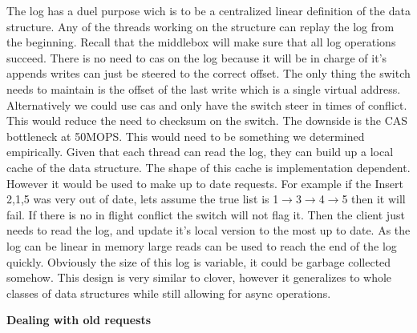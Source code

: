 The log has a duel purpose wich is to be a centralized linear definition of the
data structure. Any of the threads working on the structure can replay the log
from the beginning. Recall that the middlebox will make sure that all log
operations succeed. There is no need to cas on the log because it will be in
charge of it's appends writes can just be steered to the correct offset. The
only thing the switch needs to maintain is the offset of the last write which is
a single virtual address. Alternatively we could use cas and only have the switch
steer in times of conflict. This would reduce the need to checksum on the
switch. The downside is the CAS bottleneck at 50MOPS. This would need to be
something we determined empirically. Given that each thread can read the log,
they can build up a local cache of the data structure. The shape of this cache
is implementation dependent. However it would be used to make up to date
requests. For example if the Insert 2,1,5 was very out of date, lets assume the
true list is 1$\rightarrow$3$\rightarrow$4$\rightarrow$5 then it will fail. If there is no in flight conflict the
switch will not flag it. Then the client just needs to read the log, and update
it's local version to the most up to date. As the log can be linear in memory
large reads can be used to reach the end of the log quickly. Obviously the size
of this log is variable, it could be garbage collected somehow. This design is
very similar to clover, however it generalizes to whole classes of data
structures while still allowing for async operations.

\textbf{Dealing with old requests}

